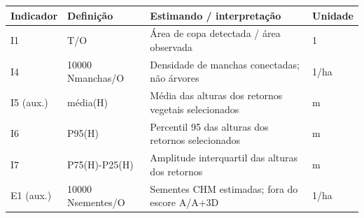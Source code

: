 \begin{tabular}{llll}
\hline
Indicador & Definição & Estimando / interpretação & Unidade \\
\hline
I1 & T/O & Área de copa detectada / área observada & 1 \\
I4 & 10000 Nmanchas/O & Densidade de manchas conectadas; não árvores & 1/ha \\
I5 (aux.) & média(H) & Média das alturas dos retornos vegetais selecionados & m \\
I6 & P95(H) & Percentil 95 das alturas dos retornos selecionados & m \\
I7 & P75(H)-P25(H) & Amplitude interquartil das alturas dos retornos & m \\
E1 (aux.) & 10000 Nsementes/O & Sementes CHM estimadas; fora do escore A/A+3D & 1/ha \\
\hline
\end{tabular}
